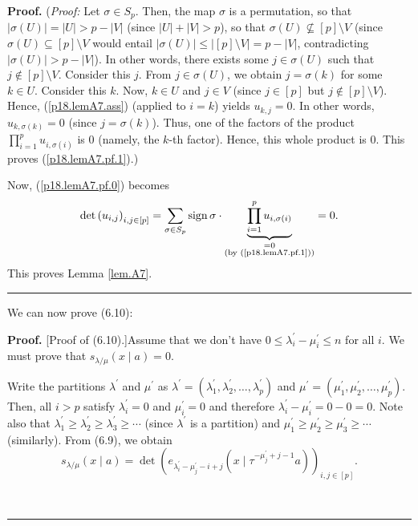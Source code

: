 \documentclass[numbers=enddot,12pt,final,onecolumn,notitlepage]{scrartcl}%
\theoremstyle{definition}
\newenvironment{proof}[1][Proof]{\noindent\textbf{#1.} }{\ \rule{0.5em}{0.5em}}
\let\sumnonlimits\sum
\let\prodnonlimits\prod
\renewcommand{\sum}{\sumnonlimits\limits}
\renewcommand{\prod}{\prodnonlimits\limits}
\begin{document}
\begin{enumerate}
\begin{proof}
(\textit{Proof:} Let $\sigma\in S_{p}$. Then, the map $\sigma$ is a
permutation, so that $\left\vert \sigma\left(  U\right)  \right\vert
=\left\vert U\right\vert >p-\left\vert V\right\vert $ (since $\left\vert
U\right\vert +\left\vert V\right\vert >p$), so that $\sigma\left(  U\right)
\not \subseteq \left[  p\right]  \setminus V$ (since $\sigma\left(  U\right)
\subseteq\left[  p\right]  \setminus V$ would entail $\left\vert \sigma\left(
U\right)  \right\vert \leq\left\vert \left[  p\right]  \setminus V\right\vert
=p-\left\vert V\right\vert $, contradicting $\left\vert \sigma\left(
U\right)  \right\vert >p-\left\vert V\right\vert $). In other words, there
exists some $j\in\sigma\left(  U\right)  $ such that $j\notin\left[  p\right]
\setminus V$. Consider this $j$. From $j\in\sigma\left(  U\right)  $, we
obtain $j=\sigma\left(  k\right)  $ for some $k\in U$. Consider this $k$. Now,
$k\in U$ and $j\in V$ (since $j\in\left[  p\right]  $ but $j\notin\left[
p\right]  \setminus V$). Hence, (\ref{p18.lemA7.ass}) (applied to $i=k$)
yields $u_{k,j}=0$. In other words, $u_{k,\sigma\left(  k\right)  }=0$ (since
$j=\sigma\left(  k\right)  $). Thus, one of the factors of the product
$\prod_{i=1}^{p}u_{i,\sigma\left(  i\right)  }$ is $0$ (namely, the $k$-th
factor). Hence, this whole product is $0$. This proves (\ref{p18.lemA7.pf.1}).)

Now, (\ref{p18.lemA7.pf.0}) becomes%
\[
\det\left(  u_{i,j}\right)  _{i,j\in\left[  p\right]  }=\sum_{\sigma\in S_{p}%
}\operatorname*{sign}\sigma\cdot\underbrace{\prod_{i=1}^{p}u_{i,\sigma\left(
i\right)  }}_{\substack{=0\\\text{(by (\ref{p18.lemA7.pf.1}))}}}=0.
\]
This proves Lemma \ref{lem.A7}.
\end{proof}

We can now prove (6.10):

\begin{proof}
[Proof of (6.10).]Assume that we don't have $0\leq\lambda_{i}^{\prime}-\mu
_{i}^{\prime}\leq n$ for all $i$. We must prove that $s_{\lambda/\mu}\left(
x\mid a\right)  =0$.

Write the partitions $\lambda^{\prime}$ and $\mu^{\prime}$ as $\lambda
^{\prime}=\left(  \lambda_{1}^{\prime},\lambda_{2}^{\prime},\ldots,\lambda
_{p}^{\prime}\right)  $ and $\mu^{\prime}=\left(  \mu_{1}^{\prime},\mu
_{2}^{\prime},\ldots,\mu_{p}^{\prime}\right)  $. Then, all $i>p$ satisfy
$\lambda_{i}^{\prime}=0$ and $\mu_{i}^{\prime}=0$ and therefore $\lambda
_{i}^{\prime}-\mu_{i}^{\prime}=0-0=0$. Note also that $\lambda_{1}^{\prime
}\geq\lambda_{2}^{\prime}\geq\lambda_{3}^{\prime}\geq\cdots$ (since
$\lambda^{\prime}$ is a partition) and $\mu_{1}^{\prime}\geq\mu_{2}^{\prime
}\geq\mu_{3}^{\prime}\geq\cdots$ (similarly). From (6.9), we obtain%
\begin{equation}
s_{\lambda/\mu}\left(  x\mid a\right)  =\det\left(  e_{\lambda_{i}^{\prime
}-\mu_{j}^{\prime}-i+j}\left(  x\mid\tau^{-\mu_{j}^{\prime}+j-1}a\right)
\right)  _{i,j\in\left[  p\right]  }. \label{p18.6.10.pf.1}%
\end{equation}



\end{proof}
\end{enumerate}
\end{document}
